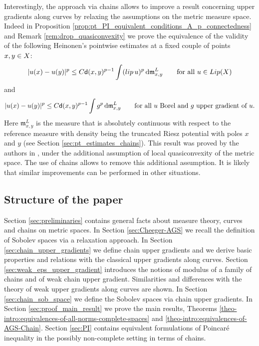 \documentclass[12pt]{amsart}
\newcommand{\sfd}{{\sf d}}
\renewcommand{\d}{{\mathrm d}}
\newcommand{\X}{{\rm X}}
\newcommand{\lip}{{\rm lip}}
\newcommand{\mm}{\mathfrak m}
\theoremstyle{definition}
\begin{document}
Interestingly, the approach via chains allows to improve a result concerning upper gradients along curves by relaxing the assumptions on the metric measure space. Indeed in Proposition \ref{prop:pt_PI_equivalent_conditions_A_p_connectedness} and Remark \ref{rem:drop_quasiconvexity} we prove the equivalence of the validity of the following Heinonen's pointwise estimates at a fixed couple of points $x,y \in \X$:
\begin{equation*}
    \vert u(x) - u(y) \vert ^p \le C\sfd(x,y)^{p-1}\int (\lip\,u)^p \,\d\mm_{x,y}^L\qquad \text{for all }u \in {\rm Lip}(\X)
\end{equation*}
and
\begin{equation*}
    \vert u(x) - u(y) \vert ^p \le C\sfd(x,y)^{p-1}\int g^p \,\d\mm_{x,y}^L\qquad\text{for all $u$ Borel and $g$ upper gradient of $u$.}
\end{equation*}
%
Here $\mm_{x,y}^L$ is the measure that is absolutely continuous with respect to the reference measure with density being the truncated Riesz potential with poles $x$ and $y$ (see Section \ref{sec:pt_estimates_chains}).
This result was proved by the authors in \cite[Theorem A.3]{CaputoCavallucci2024II}, under the additional assumption of local quasiconvexity of the metric space. The use of chains allows to remove this additional assumption. It is likely that similar improvements can be performed in other situations.
%
\subsection{Structure of the paper}
%
Section \ref{sec:preliminaries} contains general facts about measure theory, curves and chains on metric spaces. In Section \ref{sec:Cheeger-AGS} we recall the definition of Sobolev spaces via a relaxation approach. In Section \ref{sec:chain_upper_gradients} we define chain upper gradients and we derive basic properties and relations with the classical upper gradients along curves. Section \ref{sec:weak_eps_upper_gradient} introduces the notions of modulus of a family of chains and of weak chain upper gradient. Similarities and differences with the theory of weak upper gradients along curves are shown. In Section \ref{sec:chain_sob_space} we define the Sobolev spaces via chain upper gradients. In Section \ref{sec:proof_main_result} we prove the main results, Theorems \ref{theo-intro:equivalences-of-all-norms-complete-spaces} and \ref{theo-intro:equivalences-of-AGS-Chain}.
Section \ref{sec:PI} contains equivalent formulations of Poincar\'{e} inequality in the possibly non-complete setting in terms of chains.
%
\end{document}
